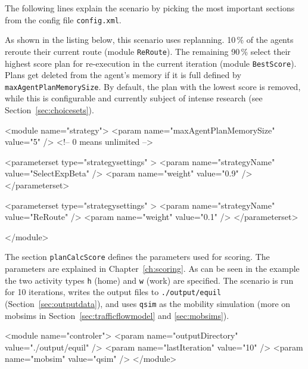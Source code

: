 The following lines explain the scenario by picking the most important sections from the config file \lstinline|config.xml|.

As shown in the listing below, this scenario uses replanning. 10\,\% of the agents reroute their current route (module \lstinline|ReRoute|). The remaining 90\,\% select their highest score plan for re-execution in the current iteration (module \lstinline|BestScore|). Plans get deleted from the agent's memory if it is full defined by \lstinline|maxAgentPlanMemorySize|. By default, the plan with the lowest score is removed, while this is configurable and currently subject of intense research (see Section~\ref{sec:choicesets}).
%
\begin{xml}
<module name="strategy">
	<param name="maxAgentPlanMemorySize" value="5" /> <!-- 0 means unlimited -->
	
	<parameterset type="strategysettings" >
		<param name="strategyName" value="SelectExpBeta" />
		<param name="weight" value="0.9" />
	</parameterset>
	
	<parameterset type="strategysettings" >
		<param name="strategyName" value="ReRoute" />
		<param name="weight" value="0.1" />
	</parameterset>
	
</module>
\end{xml}


The section \lstinline|planCalcScore| defines the parameters used for scoring. The parameters are explained in Chapter~\ref{ch:scoring}. As can be seen in the example the two activity types \lstinline|h| (home) and \lstinline|w| (work) are specified. The scenario is run for 10 iterations, writes the output files to \lstinline|./output/equil| (Section~\ref{sec:outputdata}), and uses \lstinline|qsim| as the mobility simulation (more on \gls{mobsim}s in Section~\ref{sec:trafficflowmodel} and \ref{sec:mobsims}).

\begin{xml}
<module name="controler">
	<param name="outputDirectory" value="./output/equil" />
	<param name="lastIteration" value="10" />
	<param name="mobsim" value="qsim" />	
</module>
\end{xml}


